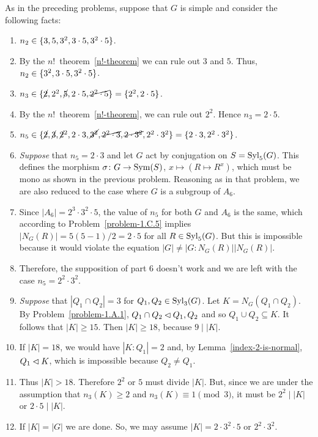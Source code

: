 \begin{solution} As in the preceding problems, suppose that $G$ is simple and consider the following facts:
\begin{enumerate}[\upshape1.]
    \item $n_2\in\{3, 5, 3^2, 3\cdot5, 3^2\cdot 5\}$.
    \item By the $n!$~theorem~\ref{n!-theorem} we can rule out $3$ and $5$. Thus, $n_2\in\{3^2,3\cdot5,3^2\cdot5\}$.
    \item $n_3\in\{\cancel2,2^2, \cancel5, 2\cdot 5, \cancel{2^2\cdot5}\}=\{2^2,2\cdot5\}$.
    \item By the $n!$~theorem~\ref{n!-theorem}, we can rule out $2^2$. Hence $n_3=2\cdot5$.
    \item $n_5\in\{\cancel2, \cancel3, \cancel2^2, 2\cdot3, \cancel{3^2}, \cancel{2^2\cdot3}, \cancel{2\cdot3^2}, 2^2\cdot3^2\} = \{2\cdot3,2^2\cdot3^2\}$.
    \item {\it Suppose} that $n_5=2\cdot3$ and let $G$ act by conjugation on $S={\rm Syl}_5(G)$. This defines the morphism $\sigma\colon G\to{\rm Sym}(S)$, $x\mapsto(R\mapsto R^x)$, which must be mono as shown in the previous problem. Reasoning as in that problem, we are also reduced to the case where $G$ is a subgroup of $A_6$. 
    \item Since $|A_6|=2^3\cdot3^2\cdot5$, the value of $n_5$ for both $G$ and $A_6$ is the same, which according to Problem~\ref{problem-1.C.5} implies $|N_G(R)|=5(5-1)/2=2\cdot5$ for all $R\in{\rm Syl}_5(G)$. But this is impossible because it would violate the equation $|G|\ne|G:N_G(R)||N_G(R)|$.
    \item Therefore, the supposition of part 6 doesn't work and we are left with the case $n_5=2^2\cdot3^2$.
    \item {\it Suppose\/} that $|Q_1\cap Q_2|=3$ for $Q_1,Q_2\in{\rm Syl}_3(G)$. Let $K=N_G(Q_1\cap Q_2)$. By Problem~\ref{problem-1.A.1}, $Q_1\cap Q_2\lhd Q_1,Q_2$ and so $Q_1\cup Q_2\subseteq K$. It follows that $|K|\ge15$. Then $|K|\ge18$, because $9\mid|K|$.
    \item If $|K|=18$, we would have $|K:Q_1|=2$ and, by Lemma~\ref{index-2-is-normal}, $Q_1\lhd K$, which is impossible because $Q_2\ne Q_1$.
    \item Thus $|K|>18$. Therefore $2^2$ or $5$ must divide $|K|$. But, since we are under the assumption that $n_3(K)\ge2$ and $n_3(K)\equiv1\pmod3$, it must be $2^2\mid|K|$ or $2\cdot5\mid|K|$.
    \item If $|K|=|G|$ we are done. So, we may assume $|K|=2\cdot3^2\cdot5$ or $2^2\cdot3^2$.

\end{enumerate}
\end{solution}
